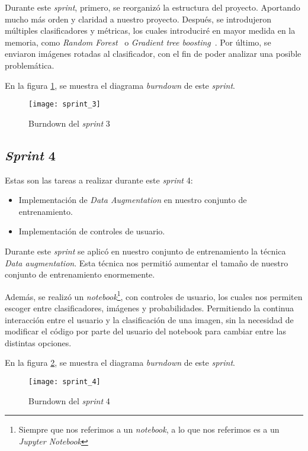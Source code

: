 Durante este \textit{sprint}, primero, se reorganizó la estructura del proyecto. Aportando mucho más orden y claridad a nuestro proyecto. Después, se introdujeron múltiples clasificadores y métricas, los cuales introduciré en mayor medida en la memoria, como \textit{Random Forest}~\cite{randomforest} o \textit{Gradient tree boosting}~\cite{gradientboosting}. Por último, se enviaron imágenes rotadas al clasificador, con el fin de poder analizar una posible problemática.

En la figura \ref{fig:A.1.4}, se muestra el diagrama \textit{burndown} de este \textit{sprint}.

\begin{figure}
\centering
\texttt{[image: sprint\_3]}
\caption{Burndown del \textit{sprint} 3}
\label{fig:A.1.4}
\end{figure}

\subsection{\textit{Sprint} 4}
Estas son las tareas a realizar durante este \textit{sprint} 4:

\begin{itemize}
	\item Implementación de \textit{Data Augmentation} en nuestro conjunto de entrenamiento.
	\item Implementación de controles de usuario.
\end{itemize}

Durante este \textit{sprint} se aplicó en nuestro conjunto de entrenamiento la técnica \textit{Data augmentation}. Esta técnica nos permitió aumentar el tamaño de nuestro conjunto de entrenamiento enormemente. 

Además, se realizó un \textit{notebook}\footnote{Siempre que nos referimos a un \textit{notebook}, a lo que nos referimos es a un \textit{Jupyter Notebook}}, con controles de usuario, los cuales nos permiten escoger entre clasificadores, imágenes y probabilidades. Permitiendo la continua interacción entre el usuario y la clasificación de una imagen, sin la necesidad de modificar el código por parte del usuario del notebook para cambiar entre las distintas opciones.

En la figura \ref{fig:A.1.5}, se muestra el diagrama \textit{burndown} de este \textit{sprint}.

\begin{figure}
\centering
\texttt{[image: sprint\_4]}
\caption{Burndown del \textit{sprint} 4}
\label{fig:A.1.5}
\end{figure}


